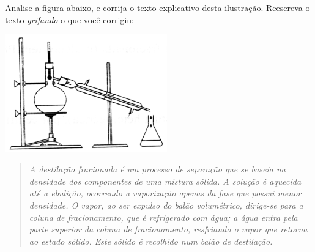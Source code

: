 Analise a figura abaixo, e corrija o texto explicativo desta ilustração.
Reescreva o texto \textit{grifando} o que você corrigiu:

\begin{center}
	\includegraphics[width = 7cm]{figure.png}
\end{center}

\begin{quote}
\textsl{
A destilação fracionada é um processo de separação que se baseia na densidade dos componentes de uma mistura sólida.
A solução é aquecida até a ebulição, ocorrendo a vaporização apenas da fase que possui menor densidade.
O vapor, ao ser expulso do balão volumétrico, dirige-se para a coluna de fracionamento, que é refrigerado com água;
a água entra pela parte superior da coluna de fracionamento, resfriando o vapor que retorna ao estado sólido.
Este sólido é recolhido num balão de destilação.}
\end{quote}